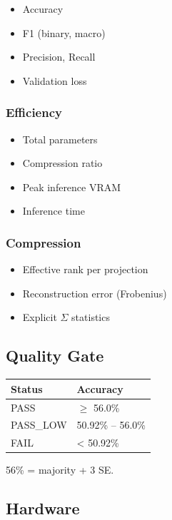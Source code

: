\begin{itemize}
\item Accuracy
\item F1 (binary, macro)
\item Precision, Recall
\item Validation loss

\end{itemize}
\subsubsection{Efficiency}

\begin{itemize}
\item Total parameters
\item Compression ratio
\item Peak inference VRAM
\item Inference time

\end{itemize}
\subsubsection{Compression}

\begin{itemize}
\item Effective rank per projection
\item Reconstruction error (Frobenius)
\item Explicit $\Sigma$ statistics

\end{itemize}
\subsection{Quality Gate}

\begin{table}[H]
\centering
\small
\begin{tabular}{ll}
\toprule
\textbf{Status} & \textbf{Accuracy} \\
\midrule
PASS & $\ge$ 56.0\% \\
PASS\_LOW & 50.92\% -- 56.0\% \\
FAIL & \textless{} 50.92\% \\
\bottomrule
\end{tabular}
\end{table}

56\% = majority + 3 SE.

\subsection{Hardware}


